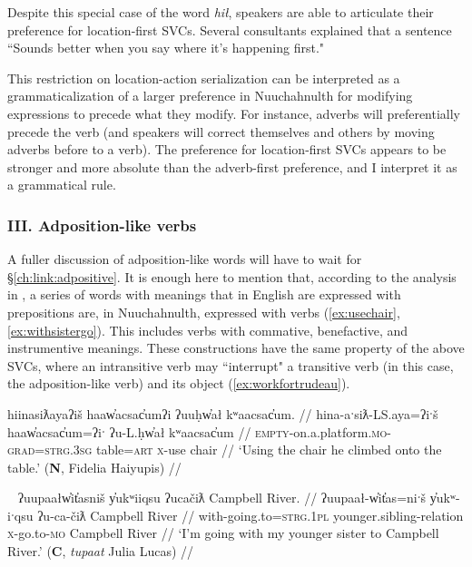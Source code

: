 Despite this special case of the word \textit{hił}, speakers are able to articulate their preference for location-first SVCs. Several consultants explained that a sentence ``Sounds better when you say where it's happening first."

This restriction on location-action serialization can be interpreted as a grammaticalization of a larger preference in Nuuchahnulth for modifying expressions to precede what they modify. For instance, adverbs will preferentially precede the verb (and speakers will correct themselves and others by moving adverbs before to a verb). The preference for location-first SVCs appears to be stronger and more absolute than the adverb-first preference, and I interpret it as a grammatical rule.

\vspace{10pt}

\subsubsection{III. Adposition-like verbs} \label{ch:sv:data:type3}

\vspace{10pt}

A fuller discussion of adposition-like words will have to wait for \S\ref{ch:link:adpositive}. It is enough here to mention that, according to the analysis in \citep{woo2007b}, a series of words with meanings that in English are expressed with prepositions are, in Nuuchahnulth, expressed with verbs (\ref{ex:usechair}, \ref{ex:withsistergo}). This includes verbs with commative, benefactive, and instrumentive meanings. These constructions have the same property of the above SVCs, where an intransitive verb may ``interrupt" a transitive verb (in this case, the adposition-like verb) and its object (\ref{ex:workfortrudeau}).


\ex \label{ex:usechair}
\begingl
\glpreamble hiinasiƛayaʔiš haaw̓acsac̓umʔi ʔuuḥw̓ał kʷaacsac̓um. //
\gla hina-aˑsiƛ-LS.aya=ʔiˑš haaw̓acsac̓um=ʔiˑ ʔu-L.ḥw̓ał kʷaacsac̓um //
\glb \textsc{empty}-on.a.platform.\textsc{mo}-\textsc{grad}=\textsc{strg.3sg} table=\textsc{art} \textsc{x}-use chair //
\glft `Using the chair he climbed onto the table.' (\textbf{N}, Fidelia Haiyupis) //
\endgl
\xe

\ex~ \label{ex:withsistergo}
\begingl
\glpreamble ʔuupaałw̓it̓asniš y̓ukʷiiqsu ʔucačiƛ Campbell River. //
\gla ʔuupaał-w̓it̓as=niˑš y̓ukʷ-iˑqsu ʔu-ca-čiƛ Campbell River //
\glb with-going.to=\textsc{strg.1pl} younger.sibling-relation \textsc{x}-go.to-\textsc{mo} Campbell River //
\glft `I'm going with my younger sister to Campbell River.' (\textbf{C}, \textit{tupaat} Julia Lucas) //
\endgl
\xe

